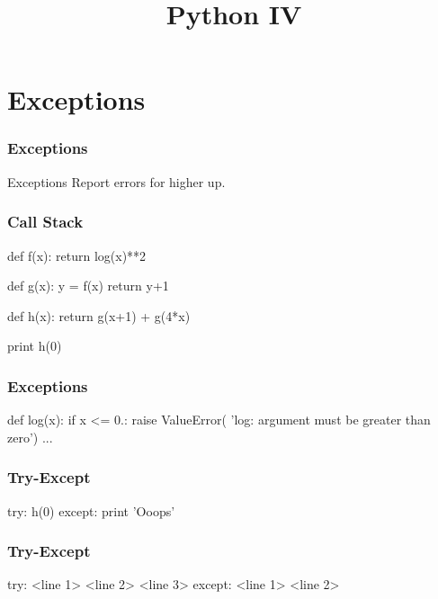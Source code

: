 
\title{Python IV}

\frame{\maketitle}

\section{Exceptions}

\begin{frame}[fragile]
\frametitle{Exceptions}

\begin{block}{Exceptions}
Report errors for higher up.
\end{block}

\end{frame}

\begin{frame}[fragile]
\frametitle{Call Stack}
\begin{python}
def f(x):
    return log(x)**2

def g(x):
    y = f(x)
    return y+1

def h(x):
    return g(x+1) + g(4*x)

print h(0)
\end{python}
\end{frame}

\begin{frame}[fragile]
\frametitle{Exceptions}

\begin{python}
def log(x):
    if x <= 0.:
        raise ValueError(
            'log: argument must be greater than zero')
    ...
\end{python}
\end{frame}

\begin{frame}[fragile]
\frametitle{Try-Except}

\begin{python}
try:
    h(0)
except:
    print 'Ooops'
\end{python}
\end{frame}

\begin{frame}[fragile]
\frametitle{Try-Except}

\begin{python}
try:
    <line 1>
    <line 2>
    <line 3>
except:
    <line 1>
    <line 2>
\end{python}
\end{frame}

